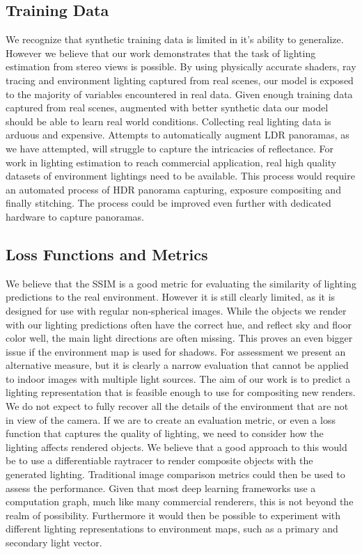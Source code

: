 \documentclass[ %
                    author={Gavin Parker},
                supervisor={Dr. Neill Campbell},
                    degree={MEng},
                     title={Deep Learning for Illumination Estimation from Stereo Images},
                  subtitle={},
                      type={Research},
                      year={2018} ]{dissertation}
\begin{document}
\subsection{Training Data}
We recognize that synthetic training data is limited in it's ability to generalize. However we believe that our work demonstrates that the task of lighting estimation from stereo views is possible. By using physically accurate shaders, ray tracing and environment lighting captured from real scenes, our model is exposed to the majority of variables encountered in real data. Given enough training data captured from real scenes, augmented with better synthetic data our model should be able to learn real world conditions. Collecting real lighting data is arduous and expensive. Attempts to automatically augment LDR panoramas, as we have attempted, will struggle to capture the intricacies of reflectance. For work in lighting estimation to reach commercial application, real high quality datasets of environment lightings need to be available. This process would require an automated process of HDR panorama capturing, exposure compositing and finally stitching. The process could be improved even further with dedicated hardware to capture panoramas.
\subsection{Loss Functions and Metrics}
We believe that the SSIM is a good metric for evaluating the similarity of lighting predictions to the real environment. However it is still clearly limited, as it is designed for use with regular non-spherical images. While the objects we render with our lighting predictions often have the correct hue, and reflect sky and floor color well, the main light directions are often missing. This proves an even bigger issue if the environment map is used for shadows. For assessment we present an alternative measure, but it is clearly a narrow evaluation that cannot be applied to indoor images with multiple light sources.
\newline
The aim of our work is to predict a lighting representation that is feasible enough to use for compositing new renders. We do not expect to fully recover all the details of the environment that are not in view of the camera. If we are to create an evaluation metric, or even a loss function that captures the quality of lighting, we need to consider how the lighting affects rendered objects. We believe that a good approach to this would be to use a differentiable raytracer to render composite objects with the generated lighting. Traditional image comparison metrics could then be used to assess the performance. Given that most deep learning frameworks use a computation graph, much like many commercial renderers, this is not beyond the realm of possibility. Furthermore it would then be possible to experiment with different lighting representations to environment maps, such as a primary and secondary light vector.
\end{document}
